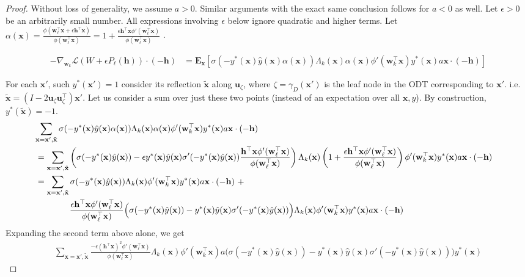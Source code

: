 \documentclass{article}
\theoremstyle{plain}
\theoremstyle{definition}
\theoremstyle{remark}
\newcommand{\E}{{\mathbf E}}
\newcommand{\1}{{\mathbf 1}}
\newcommand{\0}{{\mathbf 0}}
\newcommand{\h}{{\mathbf h}}
\newcommand{\w}{{\mathbf w}}
\newcommand{\x}{{\mathbf x}}
\newcommand{\bu}{{\mathbf u}}
\renewcommand{\>}{{\rightarrow}}
\begin{document}
\begin{proof}
Without loss of generality, we assume $a>0$. Similar arguments with the exact same conclusion follows for $a<0$ as well. Let $\epsilon>0$ be an arbitrarily small number. All expressions involving $\epsilon$ below ignore quadratic and higher terms. Let $\alpha(\x) = \frac{\phi(\w_{\ell} ^\top \x + \epsilon \h^\top \x)}{\phi(\w_{\ell} ^\top \x)} = 1+\frac{\epsilon \h^\top\x \phi'(\w_\ell^\top \x)}{\phi(\w_\ell^\top \x)}$ . 

\begin{align}
-\nabla_{\w_k} \mathcal{L}(W + \epsilon P_\ell(\h)) \cdot (-\h) 
&= 
\E_{\x} \left[ \sigma (-y^*(\x) \hat y(\x)\alpha(\x)) \Lambda_k(\x) \alpha(\x) \phi'(\w_k^\top \x) y^*(\x)a \x \cdot (-\h) \right] \nonumber  
\end{align}

For each $\x'$, such $y^*(\x')=1$ consider its reflection $\tilde \x$ along $\bu_{\zeta}$, where $\zeta = \gamma_D(\x')$ is the leaf node in the ODT corresponding to $\x'$. i.e. $\tilde\x = (I-2 \bu_\zeta \bu_\zeta^ \top)\x'$.  Let us consider a sum over just these two points (instead of an expectation over all $\x,y$). By construction, $y^*(\tilde \x)=-1$. 
\begin{align}
\lefteqn{\sum_{\x=\x',\tilde\x} \sigma (-y^*(\x) \hat y(\x)\alpha(\x)) \Lambda_k(\x) \alpha(\x) \phi'(\w_k^\top \x) y^*(\x)a \x \cdot (-\h) } \nonumber  \\
&=
\sum_{\x=\x',\tilde\x} \left(\sigma(-y^*(\x) \hat y(\x))-\epsilon y^*(\x)\hat y(\x) \sigma'(-y^*(\x) \hat y(\x))\frac{\h^\top \x \phi'(\w_\ell^\top \x)}{\phi(\w_\ell^\top \x)} \right) \Lambda_k(\x) \left(1+\frac{\epsilon \h^\top\x \phi'(\w_\ell^\top \x)}{\phi(\w_\ell^\top \x)}\right) \phi'(\w_k^\top \x) y^*(\x)a \x \cdot (-\h) \nonumber  \\
&= \sum_{\x=\x',\tilde\x} \sigma(-y^*(\x) \hat y(\x)) \Lambda_k(\x) \phi'(\w_k^\top \x) y^*(\x)a \x \cdot (-\h) ~ +   \nonumber  \\
& \qquad \qquad \frac{\epsilon \h^\top\x \phi'(\w_\ell^\top \x)}{\phi(\w_\ell^\top \x)}\Big( \sigma(-y^*(\x) \hat y(\x))-y^*(\x)\hat y(\x) \sigma'(-y^*(\x) \hat y(\x)) \Big)\Lambda_k(\x) \phi'(\w_k^\top \x) y^*(\x) a \x \cdot (-\h)  \label{eq:second_order_backlash_eq1a} 
\end{align}
Expanding the second term above alone, we get
\begin{align}
\sum_{\x=\x',\tilde\x} \frac{ -\epsilon(\h^\top\x)^2 \phi'(\w_\ell^\top \x)}{\phi(\w_\ell^\top \x)}\Lambda_k(\x) \phi'(\w_k^\top \x) a\Big( \sigma(-y^*(\x) \hat y(\x))-y^*(\x)\hat y(\x) \sigma'(-y^*(\x) \hat y(\x)) \Big) y^*(\x) 
\label{eq:temp1}
\end{align}



\end{proof}
\end{document}
